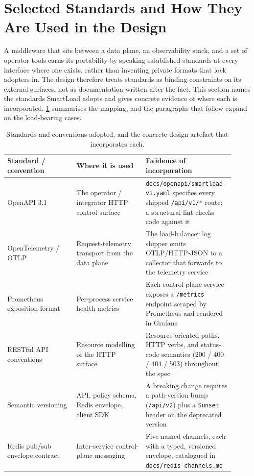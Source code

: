 \section{Selected Standards and How They Are Used in the Design}
\label{dsa:sec:standards}

A middleware that sits between a data plane, an observability stack, and a set of
operator tools earns its portability by speaking established standards at every
interface where one exists, rather than inventing private formats that lock
adopters in. The design therefore treats standards as binding constraints on its
external surfaces, not as documentation written after the fact. This section names
the standards SmartLoad adopts and gives concrete evidence of where each is
incorporated; \cref{dsa:tab:standards} summarises the mapping, and the paragraphs
that follow expand on the load-bearing cases.

\begin{table}[H]
\centering
\caption[Standards adopted and their design artefacts]{Standards and conventions adopted, and the concrete design artefact that incorporates each.}
\label{dsa:tab:standards}
\small
\begin{tabular}{@{}p{0.30\linewidth}p{0.30\linewidth}p{0.32\linewidth}@{}}
\toprule
\textbf{Standard / convention} & \textbf{Where it is used} & \textbf{Evidence of incorporation} \\
\midrule
OpenAPI 3.1 \cite{openapi} & The operator / integrator HTTP control surface &
\texttt{docs/\allowbreak openapi/\allowbreak smartload-v1.yaml} specifies every shipped \texttt{/api/v1/*} route; a structural lint checks code against it \\
OpenTelemetry / OTLP \cite{opentelemetry} & Request-telemetry transport from the data plane &
The load-balancer log shipper emits OTLP/HTTP-JSON to a collector that forwards to the telemetry service \\
Prometheus exposition format \cite{prometheus} & Per-process service health metrics &
Each control-plane service exposes a \texttt{/metrics} endpoint scraped by Prometheus and rendered in Grafana \cite{grafana} \\
RESTful API conventions & Resource modelling of the HTTP surface &
Resource-oriented paths, HTTP verbs, and status-code semantics (200 / 400 / 404 / 503) throughout the spec \\
Semantic versioning & API, policy schema, Redis envelope, client SDK &
A breaking change requires a path-version bump (\texttt{/api/v2}) plus a \texttt{Sunset} header on the deprecated version \\
Redis pub/sub envelope contract & Inter-service control-plane messaging &
Five named channels, each with a typed, versioned envelope, catalogued in \texttt{docs/redis-channels.md} \\
\bottomrule
\end{tabular}
\end{table}


